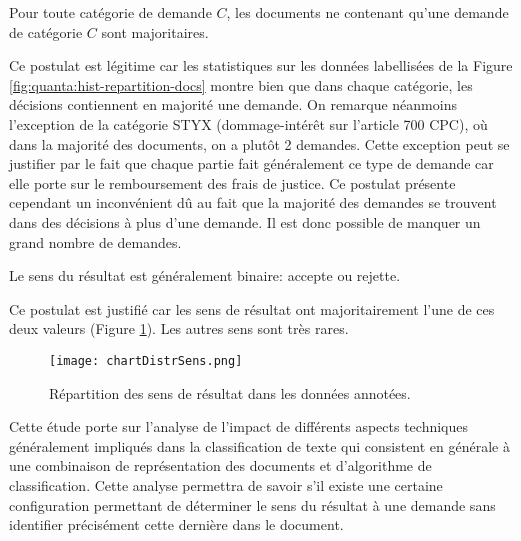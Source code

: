 \begin{postulat}\label{postulat:sens:unedemande}
Pour toute catégorie de demande $C$, les documents ne contenant qu'une demande de catégorie $C$ sont majoritaires. %
\end{postulat} 
Ce postulat est légitime car les statistiques sur les données labellisées de la Figure \ref{fig:quanta:hist-repartition-docs} montre bien que dans chaque catégorie, les décisions contiennent en majorité une demande. On remarque néanmoins l'exception de la catégorie STYX (dommage-intérêt sur l'article 700 CPC), où dans la majorité des documents, on a plutôt 2 demandes. Cette exception peut se justifier par le fait que chaque partie fait généralement ce type de demande car elle porte sur le remboursement des frais de justice. Ce postulat présente cependant un inconvénient dû au fait que la majorité des demandes se trouvent dans des décisions à plus d'une demande. Il est donc possible de manquer un grand nombre de demandes. %

\begin{postulat}\label{postulat:sens:sensbinaire}
Le sens du résultat est généralement binaire: accepte ou rejette.
\end{postulat} 
Ce postulat est justifié car les sens de résultat ont majoritairement l'une de ces deux valeurs (Figure \ref{stat-sensrst}). Les autres sens sont très rares.

\begin{figure}
\texttt{[image: chartDistrSens.png]}
\caption{Répartition des sens de résultat dans les données annotées.}\label{stat-sensrst}
\end{figure}

Cette étude porte sur l'analyse de l'impact de différents aspects techniques généralement impliqués dans la classification de texte qui consistent en générale à une combinaison de représentation des documents et d'algorithme de classification. Cette analyse permettra de savoir s'il existe une certaine configuration permettant de déterminer le sens du résultat à une demande sans identifier précisément cette dernière dans le document. 


